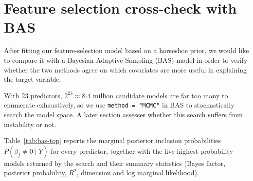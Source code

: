 %

\section{Feature selection cross-check with BAS}
\noindent
After fitting our feature-selection model based on a horseshoe prior, we
would like to compare it with a Bayesian Adaptive Sampling (BAS) model in
order to verify whether the two methods agree on which covariates are more
useful in explaining the target variable.

With $23$ predictors, $2^{23}\approx 8.4$ million candidate models are far
too many to enumerate exhaustively, so we use \texttt{method = "MCMC"} in
BAS to stochastically search the model space. A later section assesses
whether this search suffers from instability or not.

Table~\ref{tab:bas-top} reports the marginal posterior inclusion
probabilities $P(\beta_j \neq 0 \mid Y)$ for every predictor, together with
the five highest-probability models returned by the search and their
summary statistics (Bayes factor, posterior probability, $R^2$,
dimension and log marginal likelihood).

